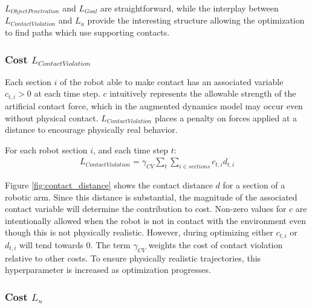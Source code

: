 \documentclass[../thesis.tex]{subfiles}
\begin{document}
$L_{Object Penetration}$ and $L_{Goal}$ are straightforward, while the interplay between $L_{Contact Violation}$ and $L_u$ provide the interesting structure allowing the optimization to find paths which use supporting contacts.




\subsubsection{Cost $L_{Contact Violation}$}
Each section $i$ of the robot able to make contact has an associated variable $c_{t,i} > 0$ at each time step. $c$ intuitively represents the allowable strength of the artificial contact force, which in the augmented dynamics model may occur even without physical contact.
$L_{Contact Violation}$ places a penalty on forces applied at a distance to encourage physically real behavior.

For each robot section $i$, and each time step $t$:
\begin{align}
  L_{Contact Violation} = \gamma_{CV} \sum_t{\sum_{i\in sections}{c_{t,i} d_{t,i}}}
\end{align}

Figure \ref{fig:contact_distance} shows the contact distance $d$ for a section of a robotic arm. Since this distance is substantial, the magnitude of the associated contact variable will determine the contribution to cost. 
Non-zero values for $c$ are intentionally allowed when the robot is not in contact with the environment even though this is not physically realistic.
However, during optimizing either $c_{t,i}$ or $d_{t,i}$ will tend towards 0.
The term $\gamma_{CV}$ weights the cost of contact violation relative to other costs.
To ensure physically realistic trajectories, this hyperparameter is increased as optimization progresses.







\subsubsection{Cost $L_u$}
\end{document}
